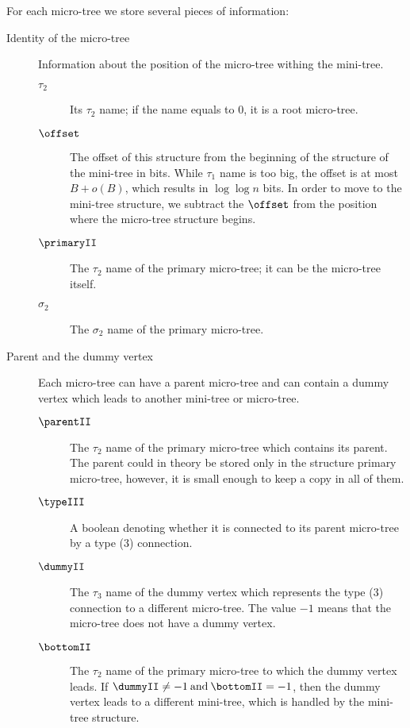 For each micro-tree we store several pieces of information:
\begin{description}
	\item[Identity of the micro-tree]
	Information about the position of the micro-tree withing the mini-tree.
	\begin{description}
		\item[$\tau_2$]
		Its $\tau_2$ name; if the name equals to $0$, it is a root micro-tree.
		
		\item[$\offset$]
		The offset of this structure from the beginning of the structure of the mini-tree in bits.
		While $\tau_1$ name is too big, the offset is at most $B + o(B)$, which results in $\log \log n$ bits.
		In order to move to the mini-tree structure, we subtract the $\offset$ from the position where the micro-tree structure begins.
		
		\item[$\primaryII$]
		The $\tau_2$ name of the primary micro-tree; it can be the micro-tree itself.
		
		\item[$\sigma_2$]
		The $\sigma_2$ name of the primary micro-tree.
	\end{description}

	\item[Parent and the dummy vertex]
	Each micro-tree can have a parent micro-tree and can contain a dummy vertex which leads to another mini-tree or micro-tree.
	\begin{description}
		\item[$\parentII$]
		The $\tau_2$ name of the primary micro-tree which contains its parent.
		The parent could in theory be stored only in the structure primary micro-tree, however, it is small enough to keep a copy in all of them.
		
		\item[$\typeIII$]
		A boolean denoting whether it is connected to its parent micro-tree by a type (3) connection.
		
		\item[$\dummyII$]
		The $\tau_3$ name of the dummy vertex which represents the type (3) connection to a different micro-tree.
		The value $-1$ means that the micro-tree does not have a dummy vertex.
		
		\item[$\bottomII$]
		The $\tau_2$ name of the primary micro-tree to which the dummy vertex leads.
		If $\dummyII \ne -1 \booland \bottomII = -1$, then the dummy vertex leads to a different mini-tree, which is handled by the mini-tree structure.
	\end{description}
	

\end{description}
